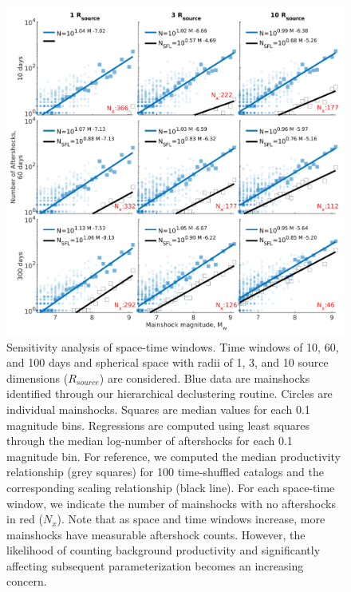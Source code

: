 \documentclass[draft]{agujournal}
\begin{document}
\begin{figure}[H]
\centering
\includegraphics[width=\linewidth]{figures/sensitivity_mw5.png}
\caption{Sensitivity analysis of space-time windows. Time windows of 10, 60, and 100 days and spherical space with radii of 1, 3, and 10 source dimensions ($R_{source}$) are considered. Blue data are mainshocks identified through our hierarchical declustering routine. Circles are individual mainshocks. Squares are median values for each 0.1 magnitude bins. Regressions are computed using least squares through the median log-number of aftershocks for each 0.1 magnitude bin. For reference, we computed the median productivity relationship (grey squares) for 100 time-shuffled catalogs and the corresponding scaling relationship (black line). For each space-time window, we indicate the number of mainshocks with no aftershocks in red ($N_x$). Note that as space and time windows increase, more mainshocks have measurable aftershock counts. However, the likelihood of counting background productivity and significantly affecting subsequent parameterization becomes an increasing concern.}
\label{fig:sensitivity}
\end{figure} 
\end{document}
